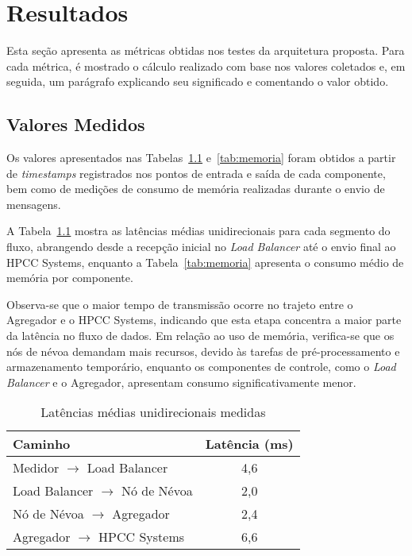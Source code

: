 \chapter{Resultados}\label{cap:resultados}

Esta seção apresenta as métricas obtidas nos testes da arquitetura proposta.  
Para cada métrica, é mostrado o cálculo realizado com base nos valores coletados e, em seguida, um parágrafo explicando seu significado e comentando o valor obtido.

\section{Valores Medidos}

Os valores apresentados nas Tabelas~\ref{tab:latencias} e~\ref{tab:memoria} foram obtidos a partir de \textit{timestamps} registrados nos pontos de entrada e saída de cada componente, bem como de medições de consumo de memória realizadas durante o envio de mensagens.  

A Tabela~\ref{tab:latencias} mostra as latências médias unidirecionais para cada segmento do fluxo, abrangendo desde a recepção inicial no \textit{Load Balancer} até o envio final ao HPCC Systems, enquanto a Tabela~\ref{tab:memoria} apresenta o consumo médio de memória por componente.  

Observa-se que o maior tempo de transmissão ocorre no trajeto entre o Agregador e o HPCC Systems, indicando que esta etapa concentra a maior parte da latência no fluxo de dados. Em relação ao uso de memória, verifica-se que os nós de névoa demandam mais recursos, devido às tarefas de pré-processamento e armazenamento temporário, enquanto os componentes de controle, como o \textit{Load Balancer} e o Agregador, apresentam consumo significativamente menor.

\begin{table}[htb]
    \caption{\label{tab:latencias}Latências médias unidirecionais medidas}
    \centering
    \begin{tabular}{|l|c|}
        \hline
            \textbf{Caminho} & \textbf{Latência (ms)} \\
        \hline
            Medidor $\rightarrow$ Load Balancer & 4,6 \\
            Load Balancer $\rightarrow$ Nó de Névoa & 2,0 \\
            Nó de Névoa $\rightarrow$ Agregador & 2,4 \\
            Agregador $\rightarrow$ HPCC Systems & 6,6 \\
        \hline
    \end{tabular}
\end{table}


